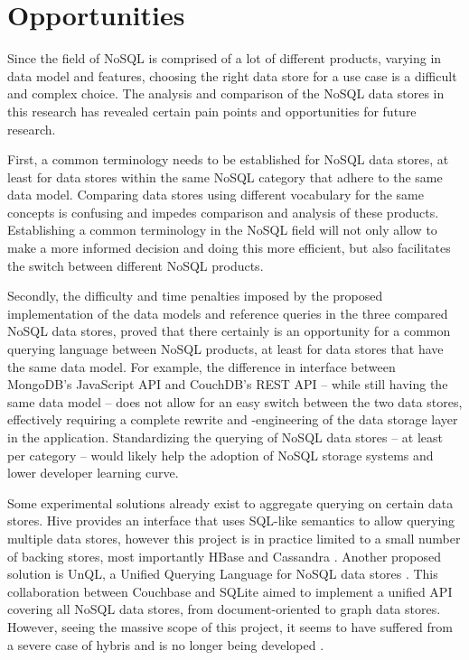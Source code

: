 \chapter{Opportunities}
\label{ch:opportunities}

Since the field of NoSQL is comprised of a lot of different products, varying in data model and features, choosing the right data store for a use case is a difficult and complex choice.
The analysis and comparison of the NoSQL data stores in this research has revealed certain pain points and opportunities for future research.

First, a common terminology needs to be established for NoSQL data stores, at least for data stores within the same NoSQL category that adhere to the same data model.
Comparing data stores using different vocabulary for the same concepts is confusing and impedes comparison and analysis of these products.
Establishing a common terminology in the NoSQL field will not only allow to make a more informed decision and doing this more efficient, but also facilitates the switch between different NoSQL products.

Secondly, the difficulty and time penalties imposed by the proposed implementation of the data models and reference queries in the three compared NoSQL data stores, proved that there certainly is an opportunity for a common querying language between NoSQL products, at least for data stores that have the same data model.
For example, the difference in interface between MongoDB's JavaScript API and CouchDB's REST API -- while still having the same data model -- does not allow for an easy switch between the two data stores, effectively requiring a complete rewrite and -engineering of the data storage layer in the application.
Standardizing the querying of NoSQL data stores -- at least per category -- would likely help the adoption of NoSQL storage systems and lower developer learning curve.

Some experimental solutions already exist to aggregate querying on certain data stores.
Hive provides an interface that uses SQL-like semantics to allow querying multiple data stores, however this project is in practice limited to a small number of backing stores, most importantly HBase and Cassandra \autocite{Hive2017}.
Another proposed solution is UnQL, a Unified Querying Language for NoSQL data stores \autocite{Buneman2000}.
This collaboration between Couchbase and SQLite aimed to implement a unified API covering all NoSQL data stores, from document-oriented to graph data stores.
However, seeing the massive scope of this project, it seems to have suffered from a severe case of hybris and is no longer being developed \autocite{Weinberger2012}.

